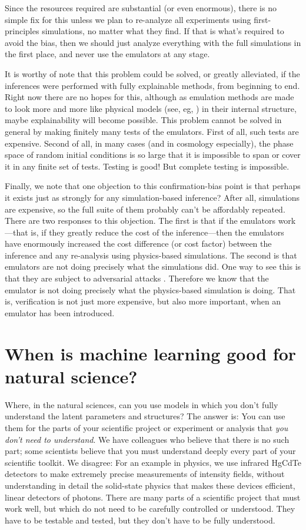 \documentclass{article}
\begin{document}
Since the resources required are substantial (or even enormous), there is no simple fix for this unless we plan to re-analyze all experiments using first-principles simulations, no matter what they find.
If that is what's required to avoid the bias, then we should just analyze everything with the full simulations in the first place, and never use the emulators at any stage.

It is worthy of note that this problem could be solved, or greatly alleviated, if the inferences were performed with fully explainable methods, from beginning to end.
Right now there are no hopes for this, although as emulation methods are made to look more and more like physical models (see, eg, \citealt{scalars, villar2023dimensionless}) in their internal structure, maybe explainability will become possible.
This problem cannot be solved in general by making finitely many tests of the emulators.
First of all, such tests are expensive.
Second of all, in many cases (and in cosmology especially), the phase space of random initial conditions is so large that it is impossible to span or cover it in any finite set of tests.
Testing is good! But complete testing is impossible.

Finally, we note that one objection to this confirmation-bias point is that perhaps it exists just as strongly for any simulation-based inference?
After all, simulations are expensive, so the full suite of them probably can't be affordably repeated.
There are two responses to this objection.
The first is that if the emulators work---that is, if they greatly reduce the cost of the inference---then the emulators have enormously increased the cost difference (or cost factor) between the inference and any re-analysis using physics-based simulations.
The second is that emulators are not doing precisely what the simulations did.
One way to see this is that they are subject to adversarial attacks \cite{melchior}.
Therefore we know that the emulator is not doing precisely what the physics-based simulation is doing.
That is, verification is not just more expensive, but also more important, when an emulator has been introduced.

\section{When is machine learning good for natural science?}\label{sec:good}
Where, in the natural sciences, can you use models in which you don't fully understand the latent parameters and structures?
The answer is: You can use them for the parts of your scientific project or experiment or analysis that \emph{you don't need to understand}.
We have colleagues who believe that there is no such part; some scientists believe that you must understand deeply every part of your scientific toolkit.
We disagree: For an example in physics, we use infrared HgCdTe detectors to make extremely precise measurements of intensity fields, without understanding in detail the solid-state physics that makes these devices efficient, linear detectors of photons.
There are many parts of a scientific project that must work well, but which do not need to be carefully controlled or understood.
They have to be testable and tested, but they don't have to be fully understood.
\end{document}

